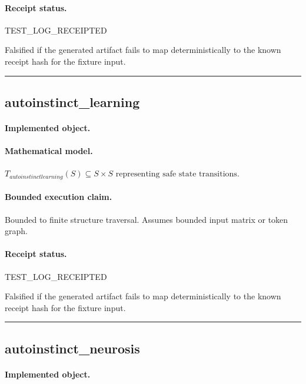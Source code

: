 \paragraph{Receipt status.} TEST\_LOG\_RECEIPTED
\begin{falsifier}
Falsified if the generated artifact fails to map deterministically to the known receipt hash for the fixture input.
\end{falsifier}

\vspace{1em}\hrule\vspace{1em}
\subsection{autoinstinct\_learning}
\paragraph{Implemented object.} 
\paragraph{Mathematical model.} $T_{autoinstinctlearning}(S) \subseteq S \times S \text{ representing safe state transitions}.$
\paragraph{Bounded execution claim.} Bounded to finite structure traversal. Assumes bounded input matrix or token graph.
\paragraph{Receipt status.} TEST\_LOG\_RECEIPTED
\begin{falsifier}
Falsified if the generated artifact fails to map deterministically to the known receipt hash for the fixture input.
\end{falsifier}

\vspace{1em}\hrule\vspace{1em}
\subsection{autoinstinct\_neurosis}
\paragraph{Implemented object.} 

